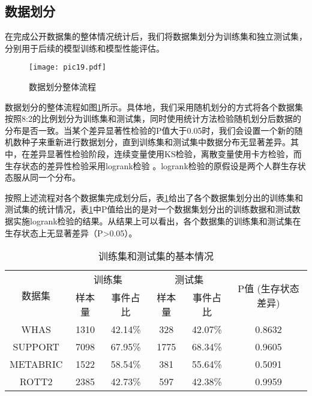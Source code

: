 \subsection{数据划分}

在完成公开数据集的整体情况统计后，我们将数据集划分为训练集和独立测试集，分别用于后续的模型训练和模型性能评估。

\begin{figure}[H]
\texttt{[image: pic19.pdf]}
\caption{数据划分整体流程}
\label{pic19}
\end{figure}

数据划分的整体流程如图\ref{pic19}所示。具体地，我们采用随机划分的方式将各个数据集按照8:2的比例划分为训练集和测试集，同时使用统计方法检验随机划分后数据的分布是否一致。当某个差异显著性检验的P值大于0.05时，我们会设置一个新的随机数种子来重新进行数据划分，直到训练集和测试集中数据分布无显著差异。其中，在差异显著性检验阶段，连续变量使用KS检验，离散变量使用卡方检验，而生存状态的差异性检验采用logrank检验 。logrank检验的原假设是两个人群生存状态服从同一个分布。

按照上述流程对各个数据集完成划分后，表\ref{table02}给出了各个数据集划分出的训练集和测试集的统计情况，表\ref{table02}中P值给出的是对一个数据集划分出的训练数据和测试数据实施logrank检验的结果。从结果上可以看出，各个数据集的训练集和测试集在生存状态上无显著差异（P>0.05）。

\begin{table}[H]
\caption{训练集和测试集的基本情况}
\begin{tabular}{cccccc}
\toprule
\multirow{2}{*}{数据集} & \multicolumn{2}{c}{训练集} & \multicolumn{2}{c}{测试集} & \multirow{2}{*}{P值 (生存状态差异)} \\ \cline{2-5} & 样本量       & 事件占比        & 样本量       & 事件占比        & \\ 
\midrule
WHAS                 & 1310      & 42.14\%     & 328       & 42.07\%     & 0.8632              \\ 
SUPPORT              & 7098      & 67.95\%     & 1775      & 68.34\%     & 0.9605              \\ 
METABRIC             & 1522      & 58.54\%     & 381       & 55.64\%     & 0.5091              \\ 
ROTT2                & 2385      & 42.73\%     & 597       & 42.38\%     & 0.9959              \\ 
\bottomrule
\end{tabular}
\label{table02}
\end{table}


